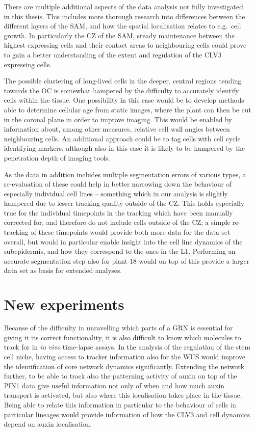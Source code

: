 There are multiple additional aspects of the data analysis not fully
investigated in this thesis. This includes more thorough research into
differences between the different layers of the SAM, and how the spatial
localisation relates to e.g.\ cell growth. In particularly the CZ of the SAM,
steady maintenance between the highest expressing cells and their contact areas
to neighbouring cells could prove to gain a better understanding of
the extent and regulation of the CLV3 expressing cells. 

The possible clustering of long-lived cells in the deeper, central regions
tending towards the OC is somewhat
hampered by the difficulty to accurately identify cells within the tissue.
One possibility in this case would be to develop methods able to determine
cellular age from static images, where the plant can then be cut in the coronal
plane in order to improve imaging. This would be enabled by information about, among
other measures, relative cell wall angles between neighbouring cells. An
additional approach could be to tag cells with cell cycle identifying markers,
although also in this case it is likely to be hampered by the penetration depth
of imaging tools.

As the data in addition includes multiple segmentation errors of various types,
a re-evaluation of these could help in better narrowing down the behaviour of
especially individual cell lines -- something which in our analysis is slightly
hampered due to lesser tracking quality outside of the CZ. This holds especially
true for the individual timepoints in the tracking which have been manually
corrected for, and therefore do not include cells outside of the CZ; a simple
re-tracking of these timepoints would provide both more data for the data set
overall, but would in particular enable insight into the cell line dynamics of
the subepidermis, and how they correspond to the ones in the L1. Performing an
accurate segmentation step also for plant 18 would on top of this provide a
larger data set as basis for extended analyses.

\section{New experiments}
Because of the difficulty in unravelling which parts of a GRN is essential for
giving it its correct functionality, it is also difficult to know which
molecules to track for in \textit{in vivo} time-lapse assays.
In the analysis of the regulation of the stem cell niche, having access to
tracker information also for the WUS would improve the identification of
core network dynamics significantly. Extending the network further, to be able
to track also the patterning activity of auxin on top of the PIN1 data give useful
information not only of when and how much auxin transport is activated, but also
where this localisation takes place in the tissue. Being able to relate this
information in particular to the behaviour of cells in particular lineages would
provide information of how the CLV3 and cell dynamics depend on auxin localisation.

